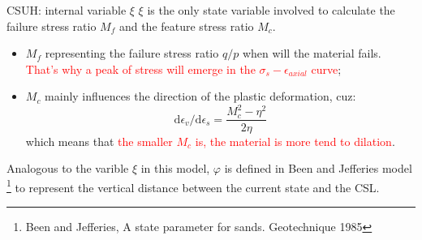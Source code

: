 \documentclass[aspectratio=169]{beamer}
\begin{document}
\begin{frame}{CSUH: internal variable $\xi$}
    $\xi$ is the only state variable involved to calculate the failure stress ratio $M_f$ and the feature stress ratio $M_c$. 
    \begin{itemize}
        \item $M_f$ representing the failure stress ratio $q/p$ when will the material fails. \textcolor{red}{That's why a peak of stress will emerge in the $\sigma_s - \epsilon_{axial}$ curve};
        \item $M_c$ mainly influences the direction of the plastic deformation, cuz: $$\mathrm{d} \epsilon_v / \mathrm{d} \epsilon_s = \frac{M_c^2-\eta^2}{2\eta}$$ which means that \textcolor{red}{the smaller $M_c$ is, the material is more tend to dilation}.
    \end{itemize}
    Analogous to the varible $\xi$ in this model,  $\varphi$ is defined in Been and Jefferies model \cite{norsandJefferies1993}\footnote{Been and Jefferies, A state parameter for sands. Geotechnique 1985} to represent the vertical distance between the current state and the CSL.
\end{frame}
\end{document}

